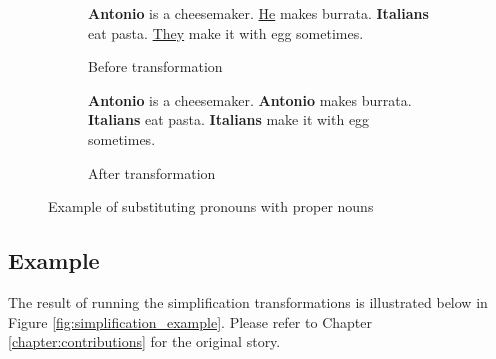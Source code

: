 \begin{figure}[H]
\begin{subfigure}{\textwidth}
\begin{displayquote}
\textbf{Antonio} is a cheesemaker. \underline{He} makes burrata.
\textbf{Italians} eat pasta. \underline{They} make it with egg sometimes.
\end{displayquote}
\caption{Before transformation}
\vspace{\baselineskip}
\end{subfigure}
\begin{subfigure}{\textwidth}
\begin{displayquote}
\textbf{Antonio} is a cheesemaker. \textbf{Antonio} makes burrata.
\textbf{Italians} eat pasta. \textbf{Italians} make it with egg sometimes.
\caption{After transformation}
\end{displayquote}
\end{subfigure}
\caption{Example of substituting pronouns with proper nouns}
\label{fig:pronoun_substitution}
\end{figure}

\subsection{Example}
\label{subsec:simplification_example}

The result of running the simplification transformations is illustrated below in Figure \ref{fig:simplification_example}. Please refer to Chapter \ref{chapter:contributions} for the original story.

